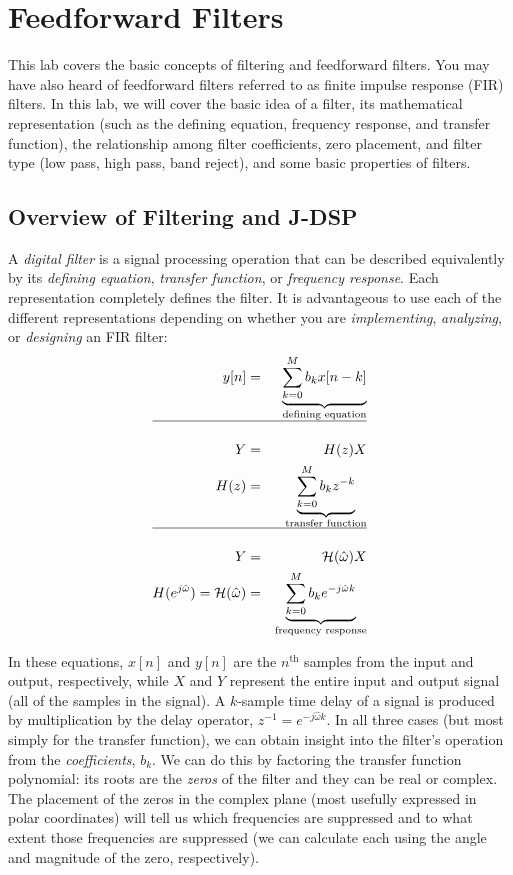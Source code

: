 
\section{Feedforward Filters}

This lab covers the basic concepts of filtering and feedforward filters. 
You may have also heard of feedforward filters referred to as 
finite impulse response (FIR) filters. In this lab, we will cover the basic idea
of a filter, its mathematical representation (such as the defining equation,
frequency response, and transfer function), the relationship among
filter coefficients, zero placement, and filter type (low pass, high
pass, band reject), and some basic properties of filters.


\subsection{Overview of Filtering and J-DSP}

A \emph{digital filter} is a signal processing operation that can be
  described equivalently by its \emph{defining
  equation}, \emph{transfer function}, or \emph{frequency response}. 
  Each representation completely defines the filter. It is advantageous 
  to use each of the different representations depending on whether you are
  \emph{implementing}, \emph{analyzing}, or \emph{designing} an FIR filter:
\begin{eqnarray*}
  y[n] &=& \underbrace{\sum_{k=0}^M b_k x[n-k]}_{\text{defining equation}} \\ 
  \hline \\
  Y &=& H(z) X\\
  H(z) &=& \underbrace{\sum_{k=0}^M b_k z^{-k}}_{ \text{transfer function} } \\
  \hline \\
  Y &=&  \mathcal{H}({\hat{\omega}}) X \\
  H(e^{j\hat{\omega}})  = \mathcal{H}({\hat{\omega}}) 
  &=& \underbrace{\sum_{k=0}^M b_k e^{-j \hat{\omega}k}}_{\text{frequency response}} 
\end{eqnarray*}

In these equations, $x[n]$ and $y[n]$ are the $n^\mathrm{th}$ samples
from the input and output, respectively, while $X$ and $Y$ represent
the entire input and output signal (all of the samples in the
signal). A $k$-sample time delay of a signal is produced by
multiplication by the delay operator, $z^{-1} = e^{-j
  \hat{\omega}k}$. In all three cases (but most simply for the
transfer function), we can obtain insight into the filter's operation
from the \emph{coefficients}, $b_k$. We can do this by factoring the
transfer function polynomial: its roots are the \emph{zeros} of the
filter and they can be real or complex.  The placement of the zeros in
the complex plane (most usefully expressed in polar coordinates) will
tell us which frequencies are suppressed and to what extent those
frequencies are suppressed (we can calculate each using the angle and
magnitude of the zero, respectively).

